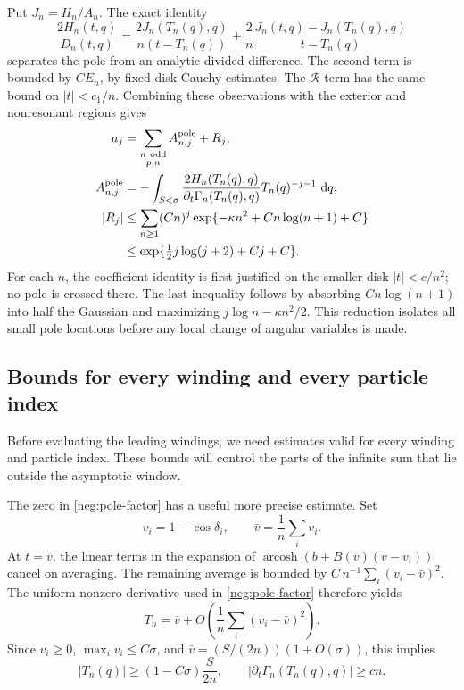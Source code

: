 \documentclass[11pt]{article}
\numberwithin{equation}{section}
\theoremstyle{definition}
\newcommand{\dd}{\,\mathrm d}
\begin{document}
Put \(J_n=H_n/A_n\).  The exact identity
\begin{equation}
 \frac{2H_n(t,q)}{D_n(t,q)}
 =\frac{2J_n(T_n(q),q)}{n(t-T_n(q))}
  +\frac2n
     \frac{J_n(t,q)-J_n(T_n(q),q)}{t-T_n(q)}
 \label{neg:division}
\end{equation}
separates the pole from an analytic divided difference.
The second term is bounded by \(CE_n\), by fixed-disk Cauchy
estimates.  The \(\mathcal R\) term has the same bound on
\(|t|<c_1/n\).  Combining these observations with the exterior
and nonresonant regions gives
\begin{align}
 a_j&=
 \sum_{\substack{n\ {\rm odd}\\p\mid n}}A^{\rm pole}_{n,j}+R_j,
 \label{neg:all-poles}\\
 A^{\rm pole}_{n,j}
 &=-\int_{S<\sigma}
   \frac{2H_n(T_n(q),q)}
        {\partial_t\Gamma_n(T_n(q),q)}
   T_n(q)^{-j-1}\,\dd q ,
 \label{neg:pole-coefficient}\\
 |R_j|
 &\le \sum_{n\ge1}(Cn)^j
             \exp\{-\kappa n^2+C n\log(n+1)+C\}\\
 &\le
 \exp\{\tfrac12 j\log(j+2)+Cj+C\}.
 \label{neg:regular-remainder}
\end{align}
For each \(n\), the coefficient identity is first justified on
the smaller disk \(|t|<c/n^2\); no pole is crossed there.
The last inequality follows by absorbing \(Cn\log(n+1)\) into
half the Gaussian and maximizing \(j\log n-\kappa n^2/2\).
This reduction isolates all small pole locations before any local
change of angular variables is made.

\subsection{Bounds for every winding and every particle index}
\label{neg:all-windings}

Before evaluating the leading windings, we need estimates valid for
every winding and particle index. These bounds will control the
parts of the infinite sum that lie outside the asymptotic window.

The zero in \eqref{neg:pole-factor} has a useful more precise
estimate.  Set
\[
 v_i=1-\cos\delta_i,\qquad \bar v=\frac1n\sum_i v_i .
 \]
At \(t=\bar v\), the linear terms in the expansion of
\(\operatorname{arcosh}(b+B(\bar v)(\bar v-v_i))\) cancel on
averaging.  The remaining average is bounded by
\(C\,n^{-1}\sum_i(v_i-\bar v)^2\).  The uniform nonzero
derivative used in \eqref{neg:pole-factor} therefore yields
\[
 T_n=\bar v+
       O\!\left(\frac1n\sum_i(v_i-\bar v)^2\right).
 \]
Since \(v_i\ge0\), \(\max_i v_i\le C\sigma\), and
\(\bar v=(S/(2n))(1+O(\sigma))\), this implies
\begin{equation}
 |T_n(q)|\ge(1-C\sigma)\frac{S}{2n},
 \qquad
 |\partial_t\Gamma_n(T_n(q),q)|\ge cn .
 \label{neg:pole-lower}
\end{equation}
\end{document}
